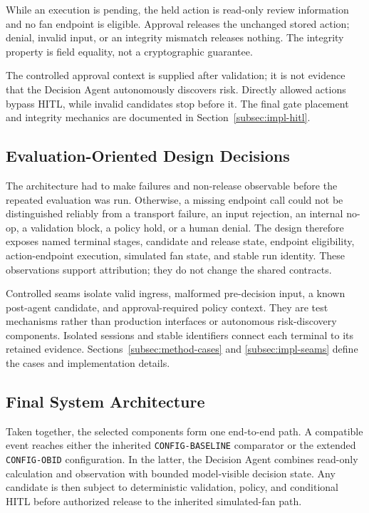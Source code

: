 While an execution is pending, the held action is read-only review information
and no fan endpoint is eligible. Approval releases the unchanged stored action;
denial, invalid input, or an integrity mismatch releases nothing. The integrity
property is field equality, not a cryptographic guarantee.

The controlled approval context is supplied after validation; it is not
evidence that the Decision Agent autonomously discovers risk. Directly allowed
actions bypass HITL, while invalid candidates stop before it. The final gate
placement and integrity mechanics are documented in
Section~\ref{subsec:impl-hitl}.

\subsection{Evaluation-Oriented Design Decisions}\label{subsec:design-evaluation}

The architecture had to make failures and non-release observable before the
repeated evaluation was run. Otherwise, a missing endpoint call could not be
distinguished reliably from a transport failure, an input rejection, an
internal no-op, a validation block, a policy hold, or a human denial. The design
therefore exposes named terminal stages, candidate and release state, endpoint
eligibility, action-endpoint execution, simulated fan state, and stable run
identity. These observations support attribution; they do not change the shared
contracts.

Controlled seams isolate valid ingress, malformed pre-decision input, a known
post-agent candidate, and approval-required policy context. They are test
mechanisms rather than production interfaces or autonomous risk-discovery
components. Isolated sessions and stable identifiers connect each terminal to
its retained evidence. Sections~\ref{subsec:method-cases} and
\ref{subsec:impl-seams} define the cases and implementation details.

\subsection{Final System Architecture}\label{subsec:design-final}

Taken together, the selected components form one end-to-end path. A compatible
event reaches either the inherited \texttt{CONFIG-BASELINE} comparator or the
extended \texttt{CONFIG-OBID} configuration. In the latter, the Decision Agent
combines read-only calculation and observation with bounded model-visible
decision state. Any candidate is then subject to deterministic validation,
policy, and conditional HITL before authorized release to the inherited
simulated-fan path.

